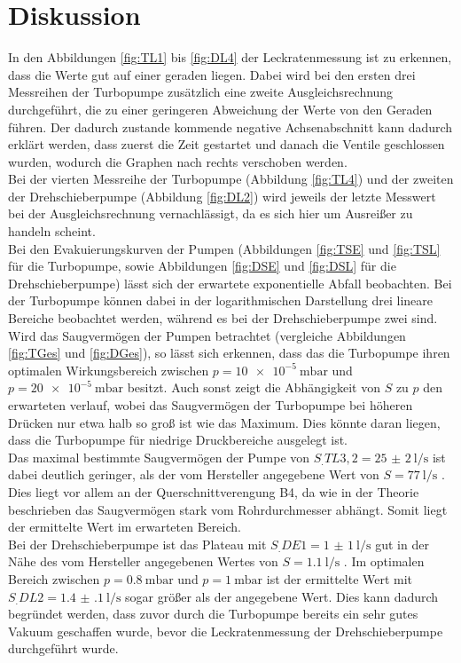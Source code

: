 
\section{Diskussion}
\label{sec:Diskussion}

In den Abbildungen \ref{fig:TL1} bis \ref{fig:DL4} der Leckratenmessung ist zu erkennen, dass die Werte gut auf einer geraden liegen. Dabei wird bei den ersten drei Messreihen der Turbopumpe zusätzlich eine zweite Ausgleichsrechnung durchgeführt, die zu einer geringeren Abweichung der Werte von den Geraden führen. Der dadurch zustande kommende negative Achsenabschnitt kann dadurch erklärt werden, dass zuerst die Zeit gestartet und danach die Ventile geschlossen wurden, wodurch die Graphen nach rechts verschoben werden.\\
Bei der vierten Messreihe der Turbopumpe (Abbildung \ref{fig:TL4}) und der zweiten der Drehschieberpumpe (Abbildung \ref{fig:DL2}) wird jeweils der letzte Messwert bei der Ausgleichsrechnung vernachlässigt, da es sich hier um Ausreißer zu handeln scheint.\\
Bei den Evakuierungskurven der Pumpen (Abbildungen \ref{fig:TSE} und \ref{fig:TSL} für die Turbopumpe, sowie Abbildungen \ref{fig:DSE} und \ref{fig:DSL} für die Drehschieberpumpe) lässt sich der erwartete exponentielle Abfall beobachten. Bei der Turbopumpe können dabei in der logarithmischen Darstellung drei lineare Bereiche beobachtet werden, während es bei der Drehschieberpumpe zwei sind.\\
Wird das Saugvermögen der Pumpen betrachtet (vergleiche Abbildungen \ref{fig:TGes} und \ref{fig:DGes}), so lässt sich erkennen, dass das die Turbopumpe ihren optimalen Wirkungsbereich zwischen $p=\SI{10e-5}{\milli\bar}$ und $p=\SI{20e-5}{\milli\bar}$ besitzt. Auch sonst zeigt die Abhängigkeit von $S$ zu $p$ den erwarteten verlauf, wobei das Saugvermögen der Turbopumpe bei höheren Drücken nur etwa halb so groß ist wie das Maximum. Dies könnte daran liegen, dass die Turbopumpe für niedrige Druckbereiche ausgelegt ist.\\
Das maximal bestimmte Saugvermögen der Pumpe von $S_.{TL3,2}=\SI{25(2)}{\litre\per\second}$ ist dabei deutlich geringer, als der vom Hersteller angegebene Wert von $S=\SI{77}{\litre\per\second}$ \cite{V70}. Dies liegt vor allem an der Querschnittverengung B4, da wie in der Theorie beschrieben das Saugvermögen stark vom Rohrdurchmesser abhängt. Somit liegt der ermittelte Wert im erwarteten Bereich.\\
Bei der Drehschieberpumpe ist das Plateau mit $S_.{DE1}=\SI{1(1)}{\litre\per\second}$ gut in der Nähe des vom Hersteller angegebenen Wertes von $S=\SI{1.1}{\litre\per\second}$ \cite{V70}.
Im optimalen Bereich zwischen $p=\SI{0.8}{\milli\bar}$ und $p=\SI{1}{\milli\bar}$ ist der ermittelte Wert mit $S_.{DL2}=\SI{1.4(1)}{\litre\per\second}$ sogar größer als der angegebene Wert. Dies kann dadurch begründet werden, dass zuvor durch die Turbopumpe bereits ein sehr gutes Vakuum geschaffen wurde, bevor die Leckratenmessung der Drehschieberpumpe durchgeführt wurde.   